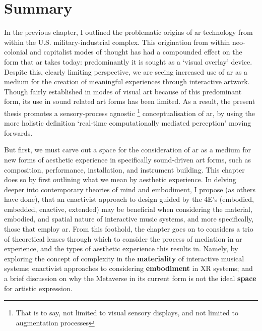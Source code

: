 \section{Summary}\label{sec: theory-summary}
In the previous chapter, I outlined the problematic origins of \gls{ar} technology from within the U.S. military-industrial complex. This origination from within neo-colonial and capitalist modes of thought has had a compounded effect on the form that \gls{ar} takes today: predominantly it is sought as a `visual overlay' device. Despite this, clearly limiting perspective, we are seeing increased use of \gls{ar} as a medium for the creation of meaningful experiences through interactive artwork. Though fairly established in modes of visual art because of this predominant form, its use in sound related art forms has been limited. As a result, the present thesis promotes a sensory-process agnostic \footnote{That is to say, not limited to visual sensory displays, and not limited to augmentation processes} conceptualisation of \gls{ar}, by using the more holistic definition `real-time computationally mediated perception' \citep{kiefer2018} moving forwards. 

But first, we must carve out a space for the consideration of \gls{ar} as a medium for new forms of aesthetic experience in specifically sound-driven art forms, such as composition, performance, installation, and instrument building. This chapter does so by first outlining what we mean by aesthetic experience. In delving deeper into contemporary theories of mind and embodiment, I propose (as others have done), that an enactivist approach to design guided by the 4E's (embodied, embedded, enactive, extended) may be beneficial when considering the material, embodied, and spatial nature of interactive music systems, and more specifically, those that employ \gls{ar}. From this foothold, the chapter goes on to considers a trio of theoretical lenses through which to consider the process of mediation in \gls{ar} experience, and the types of aesthetic experience this results in. Namely, by exploring the concept of complexity in the \textbf{materiality} of interactive musical systems; enactivist approaches to considering \textbf{embodiment} in XR systems; and a brief discussion on why the Metaverse in its current form is not the ideal \textbf{space} for artistic expression.




